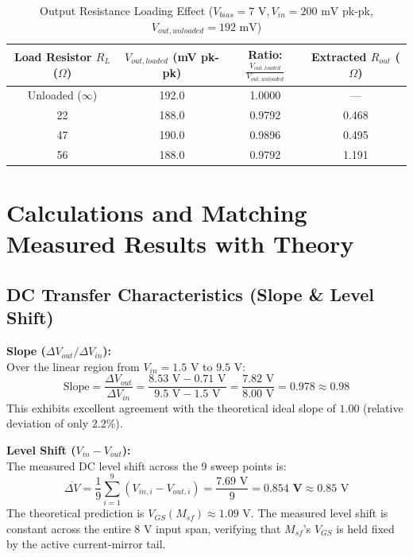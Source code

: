 \documentclass[11pt,a4paper]{article}
\begin{document}
\begin{table}[H]
\centering
\caption{Output Resistance Loading Effect ($V_{bias} = 7\text{ V}, V_{in} = 200\text{ mV}$ pk-pk, $V_{out,unloaded} = 192\text{ mV}$)}
\begin{tabular}{@{}cccc@{}}
\toprule
\textbf{Load Resistor $R_L$ ($\Omega$)} & \textbf{$V_{out,loaded}$ (mV pk-pk)} & \textbf{Ratio: $\frac{V_{out,loaded}}{V_{out,unloaded}}$} & \textbf{Extracted $R_{out}$ ($\Omega$)} \\
\midrule
Unloaded ($\infty$) & 192.0 & 1.0000 & --- \\
22  & 188.0 & 0.9792 & 0.468 \\
47  & 190.0 & 0.9896 & 0.495 \\
56  & 188.0 & 0.9792 & 1.191 \\
\bottomrule
\end{tabular}
\end{table}

\section{Calculations and Matching Measured Results with Theory}

\subsection{DC Transfer Characteristics (Slope \& Level Shift)}
\textbf{Slope ($\Delta V_{out} / \Delta V_{in}$):}\\
Over the linear region from $V_{in} = 1.5\text{ V}$ to $9.5\text{ V}$:
\begin{equation}
    \text{Slope} = \frac{\Delta V_{out}}{\Delta V_{in}} = \frac{8.53\text{ V} - 0.71\text{ V}}{9.5\text{ V} - 1.5\text{ V}} = \frac{7.82\text{ V}}{8.00\text{ V}} = \mathbf{0.978} \approx 0.98
\end{equation}
This exhibits excellent agreement with the theoretical ideal slope of $1.00$ (relative deviation of only $2.2\%$).

\vspace{0.8em}
\noindent \textbf{Level Shift ($V_{in} - V_{out}$):}\\
The measured DC level shift across the 9 sweep points is:
\begin{equation}
    \overline{\Delta V} = \frac{1}{9}\sum_{i=1}^{9} (V_{in,i} - V_{out,i}) = \frac{7.69\text{ V}}{9} = \mathbf{0.854\text{ V}} \approx 0.85\text{ V}
\end{equation}
The theoretical prediction is $V_{GS}(M_{sf}) \approx 1.09\text{ V}$. The measured level shift is constant across the entire $8\text{ V}$ input span, verifying that $M_{sf}$'s $V_{GS}$ is held fixed by the active current-mirror tail.
\end{document}
